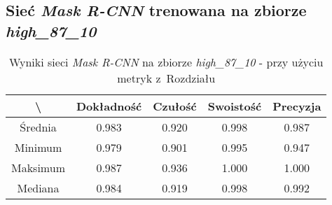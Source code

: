\subsection{Sieć \textit{Mask R-CNN} trenowana na zbiorze \textit{high\_87\_10}}
\label{sec:results_high_original}

\begin{table}[H]
	\centering
	\caption{Wyniki sieci \textit{Mask R-CNN} na zbiorze \textit{high\_87\_10} - przy użyciu metryk z~Rozdziału }
	\vspace{6pt}
	{\footnotesize
		\begin{tabular}{|c|c|c|c|c|}
      \hline \textbackslash & Dokładność & Czułość & Swoistość & Precyzja \\
      \hline Średnia & 0.983 & 0.920 & 0.998 & 0.987 \\
      \hline Minimum & 0.979 & 0.901 & 0.995 & 0.947 \\
      \hline Maksimum & 0.987 & 0.936 & 1.000 & 1.000 \\
      \hline Mediana & 0.984 & 0.919 & 0.998 & 0.992 \\
      \hline
		\end{tabular}
	}
  \vspace{0pt}
  \label{Tab:high_original_calculated}
\end{table}

